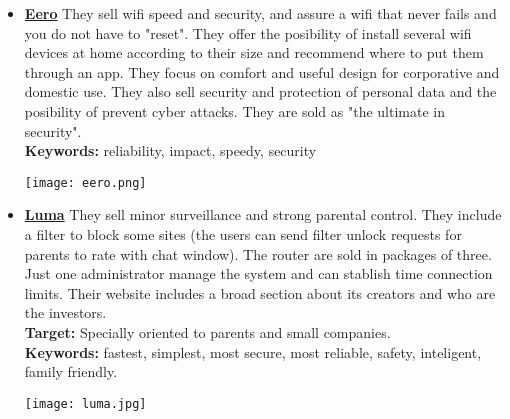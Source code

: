 \begin{itemize}
	\item \href{https://www.eero.com/}{\textbf{Eero}} They sell wifi speed and security, and assure a wifi that never fails and you do not have to "reset". They offer the posibility of install several wifi devices at home according to their size and recommend where to put them through an app. They focus on comfort and useful design for corporative and domestic use. They also sell security and protection of personal data and the posibility of prevent cyber attacks. They are sold as "the ultimate in security". \\
	\textbf{Keywords:} reliability, impact, speedy, security\\
	\begin{center}
		\texttt{[image: eero.png]}
	\end{center}
\newpage
	\item \href{https://getluma.com/}{\textbf{Luma}} They sell minor surveillance and strong parental control. They include a filter to block some sites (the users can send filter unlock requests for parents to rate with chat window). The router are sold in packages of three. Just one administrator manage the system and can stablish time connection limits. Their website includes a broad section about its creators and who are the investors.\\
		\textbf{Target:} Specially oriented to parents and small companies.\\
	\textbf{Keywords:} fastest, simplest, most secure, most reliable, safety, inteligent, family friendly.\\
	\begin{center}
		\texttt{[image: luma.jpg]}
	\end{center}


\end{itemize}
